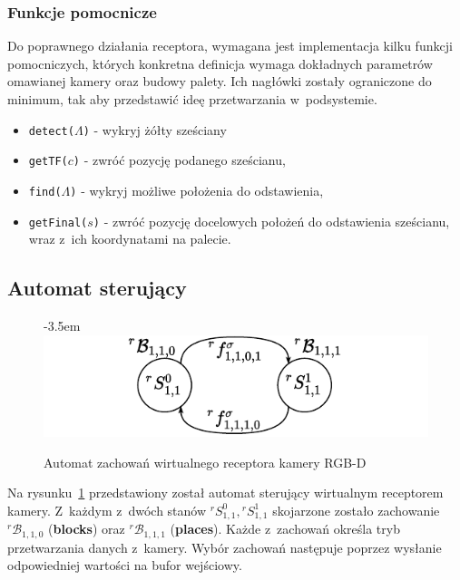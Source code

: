 \subsubsection{Funkcje pomocnicze}
Do poprawnego działania receptora, wymagana jest implementacja kilku funkcji pomocniczych, których konkretna definicja wymaga dokładnych parametrów omawianej kamery oraz budowy palety. Ich nagłówki zostały ograniczone do minimum, tak aby przedstawić ideę przetwarzania w~podsystemie.

\begin{itemize}
    \item \texttt{detect($\Lambda$)} - wykryj żółty sześciany
    \item \texttt{getTF($c$)} - zwróć pozycję podanego sześcianu,
    
    \item \texttt{find($\Lambda$)} - wykryj możliwe położenia do odstawienia,
    \item \texttt{getFinal($s$)} - zwróć pozycję docelowych położeń do odstawienia sześcianu, wraz z~ich koordynatami na palecie.
\end{itemize}

\subsection{Automat sterujący}
\begin{figure}[ht]
    \leftskip-3.5em
    \includegraphics[width=1.3\columnwidth]{figures/ISR-vr-camera-behaviours.pdf}
    \caption{Automat zachowań wirtualnego receptora kamery RGB-D}
    \label{fig:zachowania-vr-camera}
\end{figure}


Na rysunku~\ref{fig:zachowania-vr-camera} przedstawiony został automat sterujący wirtualnym receptorem kamery. Z~każdym z~dwóch stanów $ {}^{r}S_{1,1}^0,  {}^{r}S_{1,1}^1$ skojarzone zostało zachowanie ${}^{r}\mathcal{B}_{1,1,0}$ (\textbf{blocks}) oraz ${}^{r}\mathcal{B}_{1,1,1}$ (\textbf{places}). Każde z~zachowań określa tryb przetwarzania danych z~kamery. Wybór zachowań następuje poprzez wysłanie odpowiedniej wartości na bufor wejściowy. 

